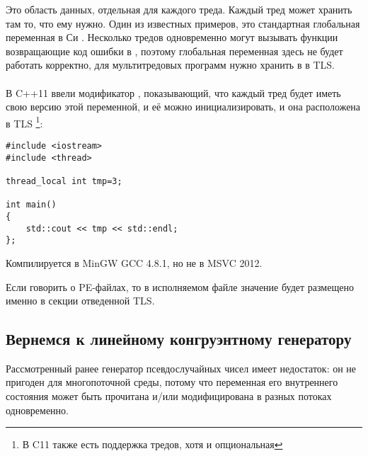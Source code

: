 \label{TLS}

Это область данных, отдельная для каждого треда. Каждый тред может хранить там то, что ему нужно.
Один из известных примеров, это стандартная глобальная переменная в Си . 
Несколько тредов одновременно могут вызывать функции возвращающие код ошибки в , поэтому глобальная переменная здесь не будет работать корректно, 
для мультитредовых программ  нужно хранить в в \ac{TLS}. \\
\\
В C++11 ввели модификатор , показывающий, что каждый тред будет иметь свою версию этой переменной, и её можно инициализировать, и она расположена в \ac{TLS}
\footnote{ В C11 также есть поддержка тредов, хотя и опциональная}:

\begin{lstlisting}[caption=C++11,style=customc]
#include <iostream>
#include <thread>

thread_local int tmp=3;

int main()
{
	std::cout << tmp << std::endl;
};
\end{lstlisting}

Компилируется в MinGW GCC 4.8.1, но не в MSVC 2012.

Если говорить о PE-файлах, то в исполняемом файле значение  будет размещено именно в секции отведенной \ac{TLS}.

\subsection{Вернемся к линейному конгруэнтному генератору}
\label{LCG_TLS}

Рассмотренный ранее  генератор псевдослучайных чисел имеет недостаток:
он не пригоден для многопоточной среды, потому что переменная его внутреннего состояния может быть
прочитана и/или модифицирована в разных потоках одновременно.





